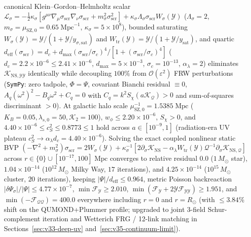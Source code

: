 \documentclass[11pt,a4paper]{article}
\begin{document}
\begin{enumerate}
canonical Klein--Gordon--Helmholtz scalar $\mathcal{L}_\sigma = -\frac{1}{2}\kappa_\sigma[g^{\mu\nu}\nabla_\mu\sigma_{\mathrm{scr}}\nabla_\nu\sigma_{\mathrm{scr}} + m_\sigma^2\sigma_{\mathrm{scr}}^2] + \kappa_\sigma\Lambda_\sigma\sigma_{\mathrm{scr}}W_\sigma(\mathcal{Y})$ ($\Lambda_\sigma=2$, $m_\sigma=\mu_{\mathrm{SZ},0}=0.65\;\mathrm{Mpc}^{-1}$, $\kappa_\sigma=5\times 10^8$), bounded saturating $W_\sigma(\mathcal{Y})=\mathcal{Y}/(1+\mathcal{Y}/y_{\sigma,\mathrm{sat}})$ and $W_{\mathrm{tr}}(\mathcal{Y})=\mathcal{Y}/(1+\mathcal{Y}/y_{\mathrm{sat}})$, and quartic $d_{\mathrm{eff}}(\sigma_{\mathrm{scr}})=d_c+d_{\max}(\sigma_{\mathrm{scr}}/\sigma_c)^4/[1+(\sigma_{\mathrm{scr}}/\sigma_c)^4]$ ($d_c=2.2\times 10^{-6}\le 2.41\times 10^{-6}$, $d_{\max}=5\times 10^{-3}$, $\sigma_c=10^{-13}$, $\alpha_\lambda=2$) eliminates $\mathcal{K}_{\mathrm{NS},\mathcal{Y}\mathcal{Y}}$ identically while decoupling $100\%$ from $\mathcal{O}(\varepsilon^2)$ FRW perturbations (\texttt{SymPy}: zero tadpole, $\Phi=\Psi$, covariant Bianchi residual $\equiv 0$, $A_q(\omega^2)^2-B_q\omega^2+C_q=0$ with $C_q=k^2 S_\chi(a\mathcal{K}_{\mathcal{Q}})>0$ and sum-of-squares discriminant $>0$). At galactic halo scale $\mu_{\mathrm{SZ},0}^{-1}=1.5385\;\mathrm{Mpc}$ ($K_B=0.05, \lambda_{s,0}=50, \mathcal{K}_2=100$), $w_\phi\le 2.20\times 10^{-6}$, $S_\chi>0$, and $4.40\times 10^{-6}\le c_S^2\le 0.8773\le 1$ hold across $a\in[10^{-9},1]$ (radiation-era UV plateau $c_S^2\to \alpha_\lambda d_c = 4.40\times 10^{-6}$). Solving the exact coupled nonlinear static BVP $(-\nabla^2+m_\sigma^2)\sigma_{\mathrm{scr}} = 2W_\sigma(\mathcal{Y}) + \kappa_\sigma^{-1}[2\partial_\sigma\mathcal{K}_{\mathrm{NS}} - \alpha_\lambda W_{\mathrm{tr}}(\mathcal{Y})\mathcal{Q}^{-1}\partial_\sigma\mathcal{K}_{\mathrm{NS},\mathcal{Q}}]$ across $r\in\{0\}\cup[10^{-17},100]\;\mathrm{Mpc}$ converges to relative residual $0.0$ ($1\,M_\odot$ star), $1.04\times 10^{-14}$ ($10^{12}\,M_\odot$ Milky Way, $17$ iterations), and $4.25\times 10^{-14}$ ($10^{15}\,M_\odot$ cluster, $20$ iterations), keeping $|\Psi|/d_{\mathrm{eff}}\le 0.964$, metric Poisson backreaction $|\delta\Psi_\sigma|/|\Psi|\le 4.77\times 10^{-7}$, $\min\mathcal{F}_{\mathcal{Y}}\ge 2.010$, $\min(\mathcal{F}_{\mathcal{Y}}+2\mathcal{Y}\mathcal{F}_{\mathcal{Y}\mathcal{Y}})\ge 1.951$, and $\min(-\mathcal{F}_{\mathcal{Q}\mathcal{Q}})=400.0$ everywhere including $r=0$ and $r=R_\odot$ (with $\le 3.84\%$ shift on the QUMOND+Plummer profile; upgraded to joint 3-field Schur-complement iteration and Wetterich FRG / 12-link matching in Sections~\ref{sec:v33-deep-uv} and~\ref{sec:v35-continuum-limit}).

\end{enumerate}
\end{document}
